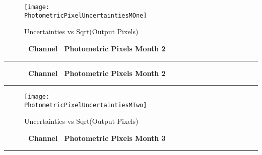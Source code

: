 \begin{figure*}[h!]
  \centering
  \texttt{[image: \\PhotometricPixelUncertaintiesMOne]}
  \caption{Uncertainties vs Sqrt(Output Pixels)}
\end{figure*}

\cleardoublepage
\begin{figure*}[h!]
  \centering
  \hfill
  {\Huge {\bf \quarter\ Channel \channel\ Photometric Pixels Month 2}}
  \hfill
\end{figure*}
\hrule
\begin{figure*}[h!]
  \centering
\end{figure*}


\cleardoublepage
\begin{figure*}[h!]
  \centering
  \hfill
  {\Huge {\bf \quarter\ Channel \channel\ Photometric Pixels Month 2}}
  \hfill
\end{figure*}
\hrule

\begin{figure*}[h!]
  \centering
  \texttt{[image: \\PhotometricPixelUncertaintiesMTwo]}
  \caption{Uncertainties vs Sqrt(Output Pixels)}
\end{figure*}

\cleardoublepage
\begin{figure*}[h!]
  \centering
  \hfill
  {\Huge {\bf \quarter\ Channel \channel\ Photometric Pixels Month 3}}
  \hfill
\end{figure*}
\hrule
\begin{figure*}[h!]
  \centering
\end{figure*}

